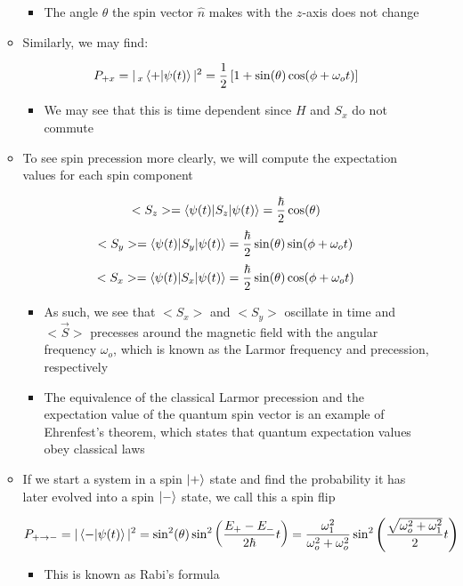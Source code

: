 \begin{itemize}
\begin{itemize}
\begin{itemize}
          \item The angle $\theta$ the spin vector $\hat{n}$ makes with the $z$-axis does not change

        \end{itemize}

      \item Similarly, we may find:

        $$P_{+x}=|\,_x\bra{+}\ket{\psi(t)}|^2=\frac{1}{2}\left[ 1+\sin(\theta)\cos(\phi+\omega_o t) \right]$$

        \begin{itemize}

          \item We may see that this is time dependent since $H$ and $S_x$ do not commute

        \end{itemize}

      \item To see spin precession more clearly, we will compute the expectation values for each spin component

        $$<S_z>=\bra{\psi(t)|S_z}\ket{\psi(t)}=\frac{\hbar}{2}\cos(\theta)$$
        $$<S_y>=\bra{\psi(t)|S_y}\ket{\psi(t)}=\frac{\hbar}{2}\sin(\theta)\sin(\phi+\omega_o t)$$
        $$<S_x>=\bra{\psi(t)|S_x}\ket{\psi(t)}=\frac{\hbar}{2}\sin(\theta)\cos(\phi+\omega_o t)$$

        \begin{itemize}

          \item As such, we see that $<S_x>$ and $<S_y>$ oscillate in time and $<\vec{S}>$ precesses around the magnetic field with the angular frequency $\omega_o$, which is known as the Larmor frequency and precession, respectively

          \item The equivalence of the classical Larmor precession and the expectation value of the quantum spin vector is an example of Ehrenfest's theorem, which states that quantum expectation values obey classical laws

        \end{itemize}

      \item If we start a system in a spin $\ket{+}$ state and find the probability it has later evolved into a spin $\ket{-}$ state, we call this a spin flip

        $$P_{+\to-}=|\bra{-}\ket{\psi(t)}|^2=\sin^2(\theta)\sin^2\left( \frac{E_+-E_-}{2\hbar}t \right)=\frac{\omega_1^2}{\omega_o^2+\omega_o^2}\sin^2\left( \frac{\sqrt{\omega_o^2+\omega_1^2}}{2}t \right)$$

        \begin{itemize}

          \item This is known as Rabi's formula

        \end{itemize}

    \end{itemize}

\end{itemize}



